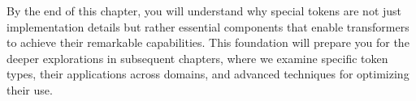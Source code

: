 By the end of this chapter, you will understand why special tokens are not just implementation details but rather essential components that enable transformers to achieve their remarkable capabilities. This foundation will prepare you for the deeper explorations in subsequent chapters, where we examine specific token types, their applications across domains, and advanced techniques for optimizing their use.
\begin{comment}
Feedback: The closing paragraph is a bit boilerplate ("This foundation will prepare you..."). Consider making it more active and benefit-oriented for the reader. For example: "Armed with this foundational knowledge, you will be equipped to not only use existing models more effectively but also to begin designing and implementing your own novel token strategies."
\end{comment}